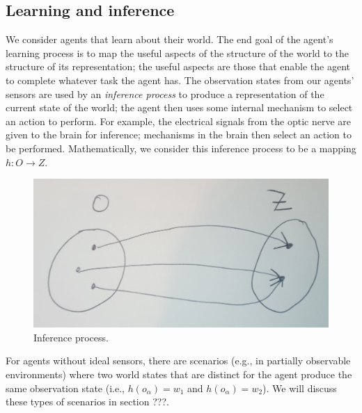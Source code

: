 \subsection{Learning and inference}

We consider agents that learn about their world.
The end goal of the agent’s learning process is to map the useful aspects of the structure of the world to the structure of its representation; the useful aspects are those that enable the agent to complete whatever task the agent has.
The observation states from our agents' sensors are used by an \emph{inference process} to produce a representation of the current state of the world; the agent
then uses some internal mechanism to select an action to perform.
For example, the electrical signals from the optic nerve are given to the brain for inference; mechanisms in the brain then select an action to be performed.
Mathematically, we consider this inference process to be a mapping $h: O \to Z$.
\begin{figure}
	\centering
	\includegraphics[width=0.5\linewidth]{2MathematicalFramework/Images/inference_process_O_to_Z.jpeg}
	\caption{
		Inference process.
	}
	\label{fig:inference_process_O_to_Z}
\end{figure}

For agents without ideal sensors, there are scenarios (e.g., in partially observable environments) where two world states that are distinct for the agent produce the same observation state (i.e., $h(o_{\alpha}) = w_{1}$ and $h(o_{\alpha}) = w_{2}$).
We will discuss these types of scenarios in section ???.

